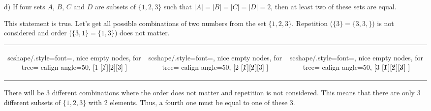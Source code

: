 \documentclass[12pt]{article}
\newenvironment{problem}[2][Problem]{\begin{trivlist}
		\item[\hskip \labelsep {\bfseries #1}\hskip \labelsep {\bfseries #2.}]}{\end{trivlist}}
\newenvironment{solution}[2][Solution]{\begin{trivlist}
		\item[\hskip \labelsep {\bfseries #1}\hskip \labelsep {\bfseries #2.}]}{\end{trivlist}}
\begin{document}
\begin{problem}{20}
(d) If four sets $A$, $B$, $C$ and $D$ are subsets of $\{1,2,3\}$ such that $|A|=|B|=|C|=|D|=2$, then at least two of these sets are equal.
\begin{solution}{d}
	This statement is true. Let's get all possible combinations of two numbers from the set $\{1,2,3\}$. Repetition ($\{3\}=\{3,3,\}$) is not considered and order ($\{3,1\}=\{1,3\}$) does not matter.
	\begin{center}
		\begin{tabular}{c c c}
			\begin{forest}
				scshape/.style={font=\scshape},
				nice empty nodes,
				for tree={
					calign angle=50,
				}
				[1
				[$\cancel{1}$][2][3]
				]
			\end{forest} & 
			\begin{forest}
				scshape/.style={font=\scshape},
				nice empty nodes,
				for tree={
					calign angle=50,
				}
				[2
				[$\cancel{1}$][$\cancel{2}$][3]
				]
			\end{forest}&
			\begin{forest}
				scshape/.style={font=\scshape},
				nice empty nodes,
				for tree={
					calign angle=50,
				}
				[3
				[$\cancel{1}$][$\cancel{2}$][$\cancel{3}$]
				]
			\end{forest}
		\end{tabular} 
	\end{center}
There will be 3 different combinations where the order does not matter and repetition is not considered. This means that there are only 3 different subsets of $\{1,2,3\}$ with 2 elements. Thus, a fourth one must be equal to one of these 3.
\end{solution} 
\end{problem}
\end{document}
